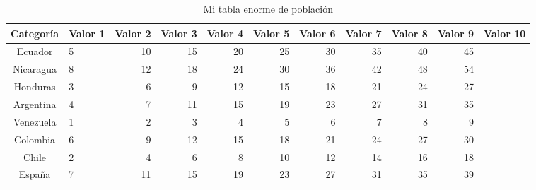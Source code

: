 \begin{sidewaystable}[htbp] %
\centering
\caption[Tabla enorme]{Mi tabla enorme de población}
\label{tab:mi-tabla-enorme} %

\begin{tabular}{clrrrrrrrrc}
\toprule
\textbf{Categoría} & \textbf{Valor 1} & \textbf{Valor 2} & \textbf{Valor 3} & \textbf{Valor 4} & \textbf{Valor 5} & \textbf{Valor 6} & \textbf{Valor 7} & \textbf{Valor 8} & \textbf{Valor 9} & \textbf{Valor 10} \\ \midrule
Ecuador & 5 & 10 & 15 & 20 & 25 & 30 & 35 & 40 & 45 \\
Nicaragua & 8 & 12 & 18 & 24 & 30 & 36 & 42 & 48 & 54 \\
Honduras & 3 & 6 & 9 & 12 & 15 & 18 & 21 & 24 & 27 \\
Argentina & 4 & 7 & 11 & 15 & 19 & 23 & 27 & 31 & 35 \\
Venezuela & 1 & 2 & 3 & 4 & 5 & 6 & 7 & 8 & 9 \\
Colombia & 6 & 9 & 12 & 15 & 18 & 21 & 24 & 27 & 30 \\
Chile & 2 & 4 & 6 & 8 & 10 & 12 & 14 & 16 & 18 \\
España & 7 & 11 & 15 & 19 & 23 & 27 & 31 & 35 & 39 \\
\bottomrule
\end{tabular}

\end{sidewaystable}

